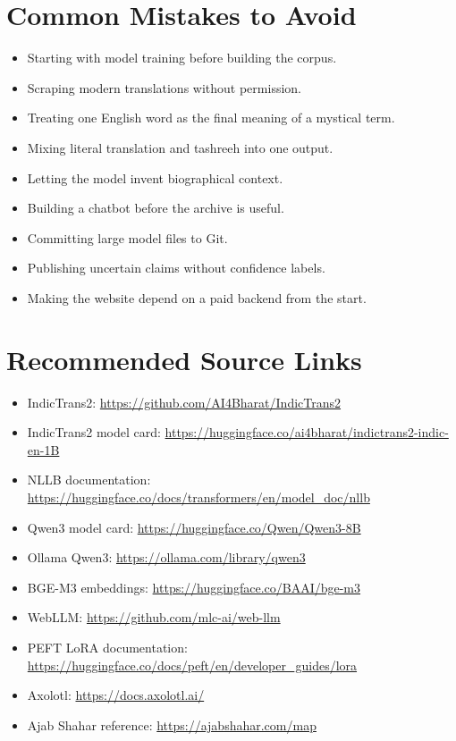 \documentclass[11pt]{article}
\begin{document}
\section{Common Mistakes to Avoid}

\begin{itemize}
  \item Starting with model training before building the corpus.
  \item Scraping modern translations without permission.
  \item Treating one English word as the final meaning of a mystical term.
  \item Mixing literal translation and tashreeh into one output.
  \item Letting the model invent biographical context.
  \item Building a chatbot before the archive is useful.
  \item Committing large model files to Git.
  \item Publishing uncertain claims without confidence labels.
  \item Making the website depend on a paid backend from the start.
\end{itemize}

\section{Recommended Source Links}

\begin{itemize}
  \item IndicTrans2: \url{https://github.com/AI4Bharat/IndicTrans2}
  \item IndicTrans2 model card: \url{https://huggingface.co/ai4bharat/indictrans2-indic-en-1B}
  \item NLLB documentation: \url{https://huggingface.co/docs/transformers/en/model_doc/nllb}
  \item Qwen3 model card: \url{https://huggingface.co/Qwen/Qwen3-8B}
  \item Ollama Qwen3: \url{https://ollama.com/library/qwen3}
  \item BGE-M3 embeddings: \url{https://huggingface.co/BAAI/bge-m3}
  \item WebLLM: \url{https://github.com/mlc-ai/web-llm}
  \item PEFT LoRA documentation: \url{https://huggingface.co/docs/peft/en/developer_guides/lora}
  \item Axolotl: \url{https://docs.axolotl.ai/}
  \item Ajab Shahar reference: \url{https://ajabshahar.com/map}
\end{itemize}
\end{document}
